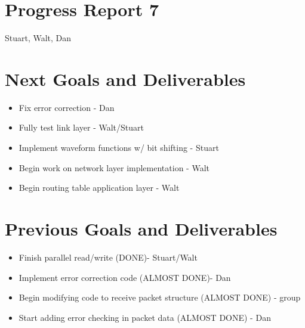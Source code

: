 \documentclass{article}
\begin{document}
\section*{Progress Report 7}
Stuart, Walt, Dan

\section*{Next Goals and Deliverables}
\begin{itemize}
    \item Fix error correction - Dan
    \item Fully test link layer - Walt/Stuart
    \item Implement waveform functions w/ bit shifting - Stuart
    \item Begin work on network layer implementation - Walt
    \item Begin routing table application layer - Walt
\end{itemize}

\section*{Previous Goals and Deliverables}
\begin{itemize}
    \item Finish parallel read/write (DONE)- Stuart/Walt
    \item Implement error correction code (ALMOST DONE)- Dan
    \item Begin modifying code to receive packet structure (ALMOST DONE) - group
    \item Start adding error checking in packet data (ALMOST DONE) - Dan
\end{itemize}

\end{document}
